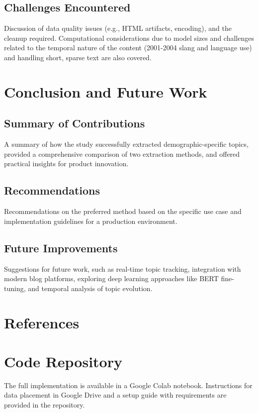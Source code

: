 \documentclass[conference]{IEEEtran}
\begin{document}
\subsection{Challenges Encountered}
Discussion of data quality issues (e.g., HTML artifacts, encoding), and the cleanup required. Computational considerations due to model sizes and challenges related to the temporal nature of the content (2001-2004 slang and language use) and handling short, sparse text are also covered.

\section{Conclusion and Future Work}
\subsection{Summary of Contributions}
A summary of how the study successfully extracted demographic-specific topics, provided a comprehensive comparison of two extraction methods, and offered practical insights for product innovation.

\subsection{Recommendations}
Recommendations on the preferred method based on the specific use case and implementation guidelines for a production environment.

\subsection{Future Improvements}
Suggestions for future work, such as real-time topic tracking, integration with modern blog platforms, exploring deep learning approaches like BERT fine-tuning, and temporal analysis of topic evolution.

\section*{References}
\printbibliography

\appendix
\section{Code Repository}
The full implementation is available in a Google Colab notebook. Instructions for data placement in Google Drive and a setup guide with requirements are provided in the repository.
\end{document}
